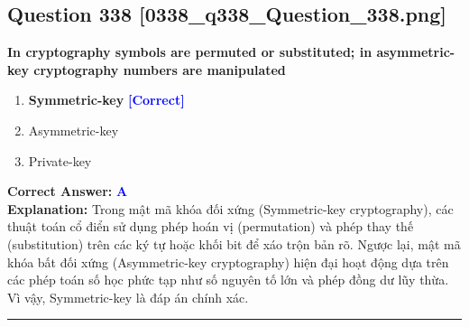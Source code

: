 \documentclass[11pt,a4paper]{article}
\begin{document}
\begin{minipage}{\textwidth}
\subsection*{Question 338 \quad \footnotesize{[0338\_q338\_Question\_338.png]}}
\noindent \textbf{In cryptography symbols are permuted or substituted; in asymmetric-key cryptography numbers are manipulated}

\begin{enumerate}[label=\Alph*.]
    \item \textbf{Symmetric-key} \hfill \textcolor{blue}{\textbf{[Correct]}}
    \item Asymmetric-key
    \item Private-key
\end{enumerate}

\noindent \textbf{Correct Answer:} \textcolor{blue}{\textbf{A}} \\[2pt]
\noindent \textbf{Explanation:} Trong mật mã khóa đối xứng (Symmetric-key cryptography), các thuật toán cổ điển sử dụng phép hoán vị (permutation) và phép thay thế (substitution) trên các ký tự hoặc khối bit để xáo trộn bản rõ. Ngược lại, mật mã khóa bất đối xứng (Asymmetric-key cryptography) hiện đại hoạt động dựa trên các phép toán số học phức tạp như số nguyên tố lớn và phép đồng dư lũy thừa. Vì vậy, Symmetric-key là đáp án chính xác.

\par\vspace{0.3cm}
\hrule
\vspace{0.3cm}
\end{minipage}
\end{document}
